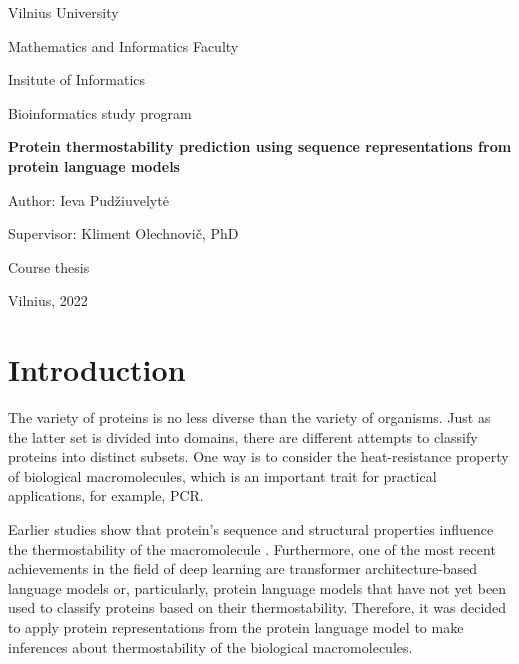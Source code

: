 \documentclass[12pt]{article}
\begin{document}
	\begin{center}

	    \vspace*{1cm}
	    \Large
	    Vilnius University

		Mathematics and Informatics Faculty

		Insitute of Informatics 

		Bioinformatics study program
	    
        \vspace*{4cm}
        \Large
		\textbf{Protein thermostability prediction using 
		sequence representations from protein 
		language models}

	\end{center}

	\begin{flushright}

		\vspace*{2cm}
        \large
        Author: Ieva Pudžiuvelytė

        Supervisor: Kliment Olechnovič, PhD 
        
	\end{flushright}

	\begin{center}
		\vspace*{4cm}
        \large
        Course thesis
        
        \vspace*{2cm}
        \large
        Vilnius, 2022
	\end{center}
	
	\newpage

	\tableofcontents

	\newpage
	
	\Large
	\section{Introduction}

    \vspace*{1cm}
        
	\normalsize

	The variety of proteins is no less diverse than the variety of organisms. 
	Just as the latter set is divided into domains, there are different 
	attempts to classify proteins into distinct subsets. One way is to 
	consider the heat-resistance property of biological macromolecules, which 
	is an important trait for practical applications, for example, PCR.

	Earlier studies show that protein's sequence and structural properties 
	influence the thermostability of the macromolecule \cite{modarres2016protein}. 
	Furthermore, one of the most recent achievements in the field of deep 
	learning are transformer architecture-based language models or, particularly, 
	protein language models that have not yet been used to classify proteins based on
	their thermostability. Therefore, it was decided to apply protein 
	representations from the protein language model to make inferences about 
	thermostability of the biological macromolecules.
\end{document}
